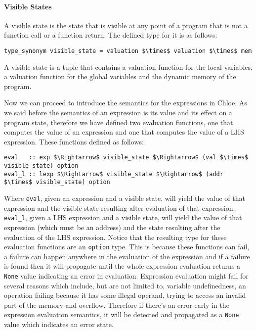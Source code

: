 \paragraph{Visible States}\label{paragraph:visible_state}

A visible state is the state that is visible at any point of a program that is not a function call or a function return.
The defined type for it is as follows:

\begin{lstlisting}[frame=single, mathescape=true]
type_synonym visible_state = valuation $\times$ valuation $\times$ mem
\end{lstlisting}

A visible state is a tuple that contains a valuation function for the local variables, a valuation function for the global variables and the dynamic memory of the program.


Now we can proceed to introduce the semantics for the expressions in Chloe.
As we said before the semantics of an expression is its value and its effect on a program state, therefore we have defined two evaluation functions, one that computes the value of an expression and one that computes the value of a LHS expression.
These functions defined as follows:

\begin{lstlisting}[frame=single, mathescape=true]
eval   :: exp $\Rightarrow$ visible_state $\Rightarrow$ (val $\times$ visible_state) option
eval_l :: lexp $\Rightarrow$ visible_state $\Rightarrow$ (addr $\times$ visible_state) option
\end{lstlisting}

Where \verb|eval|, given an expression and a visible state, will yield the value of that expression and the visible state resulting after evaluation of that expression.
\verb|eval_l|, given a LHS expression and a visible state, will yield the value of that expression (which must be an address) and the state resulting after the evaluation of the LHS expression.
Notice that the resulting type for these evaluation functions are an \verb|option| type.
This is because these functions can fail, a failure can happen anywhere in the evaluation of the expression and if a failure is found then it will propagate until the whole expression evaluation returns a \verb|None| value indicating an error in evaluation.
Expression evaluation might fail for several reasons which include, but are not limited to, variable undefinedness, an operation failing because it has some illegal operand, trying to access an invalid part of the memory and overflow.
Therefore if there's an error early in the expression evaluation semantics, it will be detected and propagated as a \verb|None| value which indicates an error state.


